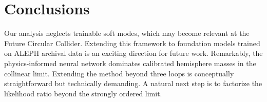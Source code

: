 \section{Conclusions}\label{sec:conclusions}

Our analysis neglects trainable soft modes, which may become relevant at
the Future Circular Collider. Extending this framework to foundation
models trained on ALEPH archival data is an exciting direction for
future work. Remarkably, the physics-informed neural network dominates
calibrated hemisphere masses in the collinear limit. Extending the
method beyond three loops is conceptually straightforward but
technically demanding. A natural next step is to factorize the
likelihood ratio beyond the strongly ordered limit.

